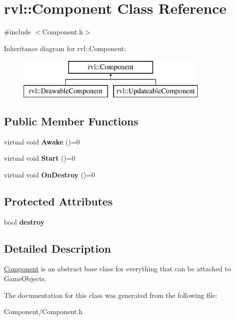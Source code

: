 \hypertarget{classrvl_1_1_component}{}\section{rvl\+:\+:Component Class Reference}
\label{classrvl_1_1_component}


{\ttfamily \#include $<$Component.\+h$>$}

Inheritance diagram for rvl\+:\+:Component\+:\begin{figure}[H]
\begin{center}
\leavevmode
\includegraphics[height=2.000000cm]{classrvl_1_1_component}
\end{center}
\end{figure}
\subsection*{Public Member Functions}
\begin{DoxyCompactItemize}
\item 
\mbox{\label{classrvl_1_1_component_a497f250d243d1c7de41c0bf4676903b1}} 
virtual void {\bfseries Awake} ()=0
\item 
\mbox{\label{classrvl_1_1_component_ad3e6a3ef9492973b4df7770cc3cf92d2}} 
virtual void {\bfseries Start} ()=0
\item 
\mbox{\label{classrvl_1_1_component_a85b9c9b9750440caf128b61afb20de4c}} 
virtual void {\bfseries On\+Destroy} ()=0
\end{DoxyCompactItemize}
\subsection*{Protected Attributes}
\begin{DoxyCompactItemize}
\item 
\mbox{\label{classrvl_1_1_component_aa5cd621700ec5a36be00f9fbd9ef9b8f}} 
bool {\bfseries destroy}
\end{DoxyCompactItemize}


\subsection{Detailed Description}
\hyperlink{classrvl_1_1_component}{Component} is an abstract base class for everything that can be attached to Game\+Objects. 

The documentation for this class was generated from the following file\+:\begin{DoxyCompactItemize}
\item 
Component/Component.\+h\end{DoxyCompactItemize}
